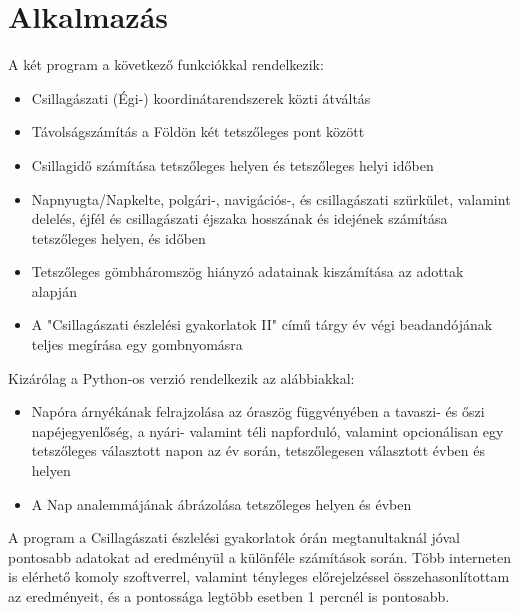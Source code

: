 \section{Alkalmazás}

A két program a következő funkciókkal rendelkezik:
\begin{itemize}
  \item Csillagászati (Égi-) koordinátarendszerek közti átváltás
  \item Távolságszámítás a Földön két tetszőleges pont között
  \item Csillagidő számítása tetszőleges helyen és tetszőleges helyi időben
  \item Napnyugta/Napkelte, polgári-, navigációs-, és csillagászati szürkület, valamint delelés, éjfél és csillagászati éjszaka hosszának és idejének számítása tetszőleges helyen, és időben
  \item Tetszőleges gömbháromszög hiányzó adatainak kiszámítása az adottak alapján
  \item A "Csillagászati észlelési gyakorlatok II" című tárgy év végi beadandójának teljes megírása egy gombnyomásra
\end{itemize}
\pagebreak
Kizárólag a Python-os verzió rendelkezik az alábbiakkal:
\begin{itemize}
  \item Napóra árnyékának felrajzolása az óraszög függvényében a tavaszi- és őszi napéjegyenlőség, a nyári- valamint téli napforduló, valamint opcionálisan egy tetszőleges választott napon az év során, tetszőlegesen választott évben és helyen
  \item A Nap analemmájának ábrázolása tetszőleges helyen és évben
\end{itemize}
A program a Csillagászati észlelési gyakorlatok órán megtanultaknál jóval pontosabb adatokat ad eredményül a különféle számítások során. Több interneten is elérhető komoly szoftverrel, valamint tényleges előrejelzéssel összehasonlítottam az eredményeit, és a pontossága legtöbb esetben 1 percnél is pontosabb.